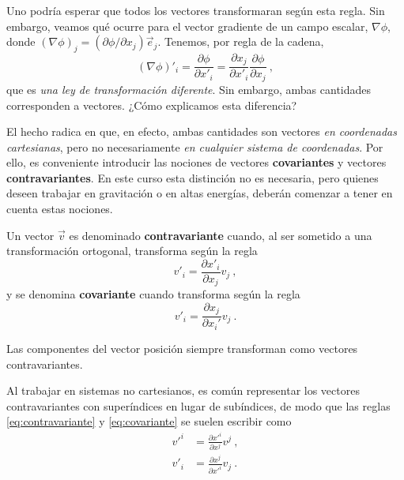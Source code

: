 Uno podría esperar que todos los vectores transformaran según esta regla. Sin embargo, veamos qué ocurre para el vector gradiente de un campo escalar, $\nabla\phi$, donde $(\nabla \phi)_j = (\partial \phi/\partial x_j )\vec{e}_j$. Tenemos, por regla de la cadena,
\begin{equation}
    (\nabla \phi)'_i = \frac{\partial \phi}{\partial x'_i} = \frac{\partial x_j}{\partial x'_i} \frac{\partial \phi}{\partial x_j} \ ,
\end{equation}
que es \emph{una ley de transformación diferente}. Sin embargo, ambas cantidades corresponden a vectores. ¿Cómo explicamos esta diferencia?

El hecho radica en que, en efecto, ambas cantidades son vectores \emph{en coordenadas cartesianas}, pero no necesariamente \emph{en cualquier sistema de coordenadas}. Por ello, es conveniente introducir las nociones de vectores \textbf{covariantes} y vectores \textbf{contravariantes}. En este curso esta distinción no es necesaria, pero quienes deseen trabajar en gravitación o en altas energías, deberán comenzar a tener en cuenta estas nociones.

\begin{defi} 
    Un vector $\vec{v}$ es denominado \textbf{contravariante} cuando, al ser sometido a una transformación ortogonal, transforma según la regla
    \begin{equation} \label{eq:contravariante}
        v'_i = \frac{\partial x'_i}{\partial x_j} v_j \ ,
    \end{equation}
    y se denomina \textbf{covariante} cuando transforma según la regla
    \begin{equation} \label{eq:covariante}
        v'_i = \frac{\partial x_j}{\partial x_i'} v_j \ .
    \end{equation}

    Las componentes del vector posición siempre transforman como vectores contravariantes.
\end{defi}


Al trabajar en sistemas no cartesianos, es común representar los vectores contravariantes con superíndices en lugar de subíndices, de modo que las reglas \eqref{eq:contravariante} y \eqref{eq:covariante} se suelen escribir como
\begin{align*}
    v'^i & = \frac{\partial x'^{i}}{\partial x^j} v^j \ , \\
    v'_i & = \frac{\partial x^j}{\partial x'^{i}} v_j \ .
\end{align*}

